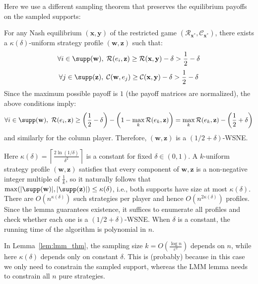 Here we use a different sampling theorem that preserves the equilibrium payoffs on the sampled supports:

\begin{lemma}
  For any Nash equilibrium \((\mathbf{x}, \mathbf{y})\) of the restricted game \((\mathcal{R}_{\mathbf{x}^*}, \mathcal{C}_{\mathbf{x}^*})\), there exists a \(\kappa(\delta)\)-uniform strategy profile \((\mathbf{w}, \mathbf{z})\) such that:
  \[
    \forall i \in \supp(\mathbf{w}),\; \mathcal{R}(e_i, \mathbf{z}) \ge \mathcal{R}(\mathbf{x}, \mathbf{y}) - \delta > \frac12 - \delta
  \]
  \[
    \forall j \in \supp(\mathbf{z}),\; \mathcal{C}(\mathbf{w}, e_j) \ge \mathcal{C}(\mathbf{x}, \mathbf{y}) - \delta > \frac12 - \delta
  \]
  Since the maximum possible payoff is \(1\) (the payoff matrices are normalized), the above conditions imply:
  \[
    \forall i \in \supp(\mathbf{w}),\ \mathcal{R}(e_i, \mathbf{z}) \ge \left(\frac12 - \delta\right) - \left(1 - \max_k \mathcal{R}(e_k, \mathbf{z})\right) = \max_k \mathcal{R}(e_k, \mathbf{z}) - \left(\frac12 + \delta\right)
  \]
  and similarly for the column player. Therefore, \((\mathbf{w}, \mathbf{z})\) is a \((1/2+\delta)\)-WSNE.
\end{lemma}

Here \(\kappa(\delta) = \left\lceil \frac{2 \ln (1/\delta)}{\delta^2} \right\rceil\) is a constant for fixed \(\delta \in (0,1)\). A \(k\)-uniform strategy profile \((\mathbf{w}, \mathbf{z})\) satisfies that every component of \(\mathbf{w}, \mathbf{z}\) is a non-negative integer multiple of \(\frac{1}{k}\), so it naturally follows that \(\max(|\supp(\mathbf{w})|, |\supp(\mathbf{z})|) \le \kappa(\delta)\), i.e., both supports have size at most \(\kappa(\delta)\). There are \(O(n^{\kappa(\delta)})\) such strategies per player and hence \(O(n^{2\kappa(\delta)})\) profiles. Since the lemma guarantees existence, it suffices to enumerate all profiles and check whether each one is a \((1/2+\delta)\)-WSNE. When \(\delta\) is a constant, the running time of the algorithm is polynomial in \(n\).

\begin{remark}
  In Lemma~\ref{lem:lmm_thm}, the sampling size \(k = O\left(\frac{\log n}{\varepsilon^2}\right)\) depends on \(n\), while here \(\kappa(\delta)\) depends only on constant \(\delta\). This is (probably) because in this case we only need to constrain the sampled support, whereas the LMM lemma needs to constrain all \(n\) pure strategies.
\end{remark}
